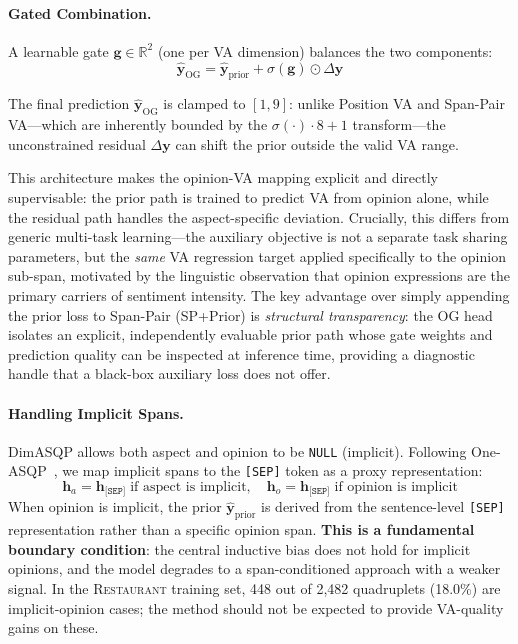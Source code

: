 \documentclass[runningheads]{llncs}
\newcommand{\restaurant}{{\normalfont\textsc{Restaurant}}}
\begin{document}
\paragraph{Gated Combination.} A learnable gate $\mathbf{g} \in \mathbb{R}^2$ (one per VA dimension) balances the two components:
\begin{equation}
    \hat{\mathbf{y}}_{\text{OG}} = \hat{\mathbf{y}}_{\text{prior}} + \sigma(\mathbf{g}) \odot \Delta\mathbf{y}
    \label{eq:og}
\end{equation}

The final prediction $\hat{\mathbf{y}}_{\text{OG}}$ is clamped to $[1, 9]$: unlike Position VA and Span-Pair VA---which are inherently bounded by the $\sigma(\cdot)\!\cdot\!8 + 1$ transform---the unconstrained residual $\Delta\mathbf{y}$ can shift the prior outside the valid VA range.

This architecture makes the opinion-VA mapping explicit and directly supervisable: the prior path is trained to predict VA from opinion alone, while the residual path handles the aspect-specific deviation. Crucially, this differs from generic multi-task learning---the auxiliary objective is not a separate task sharing parameters, but the \emph{same} VA regression target applied specifically to the opinion sub-span, motivated by the linguistic observation that opinion expressions are the primary carriers of sentiment intensity. The key advantage over simply appending the prior loss to Span-Pair (SP+Prior) is \emph{structural transparency}: the OG head isolates an explicit, independently evaluable prior path whose gate weights and prediction quality can be inspected at inference time, providing a diagnostic handle that a black-box auxiliary loss does not offer.

\paragraph{Handling Implicit Spans.}
DimASQP allows both aspect and opinion to be \texttt{NULL} (implicit). Following One-ASQP~\cite{gao2023oneasqp}, we map implicit spans to the \texttt{[SEP]} token as a proxy representation:
\begin{equation}
    \mathbf{h}_a = \mathbf{h}_{\texttt{[SEP]}} \;\text{if aspect is implicit}, \quad
    \mathbf{h}_o = \mathbf{h}_{\texttt{[SEP]}} \;\text{if opinion is implicit}
    \label{eq:null}
\end{equation}
When opinion is implicit, the prior $\hat{\mathbf{y}}_{\text{prior}}$ is derived from the sentence-level \texttt{[SEP]} representation rather than a specific opinion span. \textbf{This is a fundamental boundary condition}: the central inductive bias does not hold for implicit opinions, and the model degrades to a span-conditioned approach with a weaker signal. In the \restaurant{} training set, 448 out of 2,482 quadruplets (18.0\%) are implicit-opinion cases; the method should not be expected to provide VA-quality gains on these.
\end{document}

